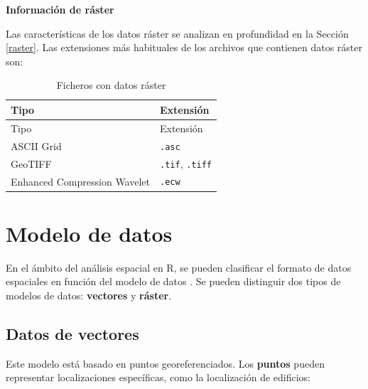 \documentclass[
]{report}
\begin{document}
\textbf{Información de ráster}

Las características de los datos ráster se analizan en profundidad en la Sección
\ref{raster}. Las extensiones más habituales de los archivos que contienen
datos ráster son:

\begin{longtable}[]{@{}ll@{}}
\caption{Ficheros con datos ráster}\tabularnewline
\toprule
Tipo & Extensión \\
\midrule
\endfirsthead
\toprule
Tipo & Extensión \\
\midrule
\endhead
ASCII Grid & \texttt{.asc} \\
GeoTIFF & \texttt{.tif}, \texttt{.tiff} \\
Enhanced Compression Wavelet & \texttt{.ecw} \\
\bottomrule
\end{longtable}

\hypertarget{modelo-de-datos}{%
\section{Modelo de datos}\label{modelo-de-datos}}

En el ámbito del análisis espacial en R, se pueden clasificar el formato de
datos espaciales en función del modelo de datos \citep{Lovelance_et_al_2019}. Se
pueden distinguir dos tipos de modelos de datos: \textbf{vectores} y \textbf{ráster}.

\hypertarget{vec}{%
\subsection{Datos de vectores}\label{vec}}

Este modelo está basado en puntos georeferenciados. Los \textbf{puntos} pueden
representar localizaciones específicas, como la localización de edificios:
\end{document}
